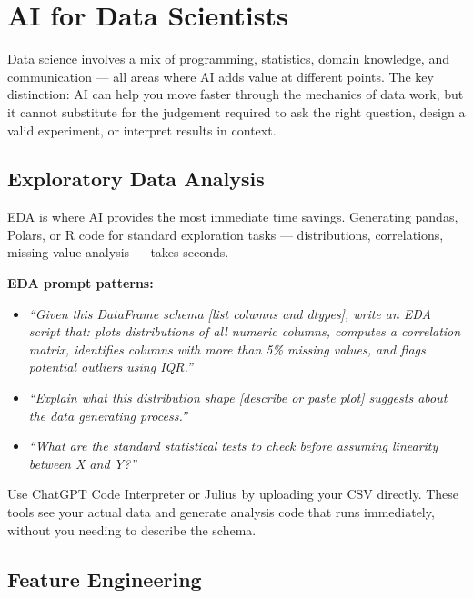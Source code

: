 \chapter{AI for Data Scientists}
\label{ch:datascience}

Data science involves a mix of programming, statistics, domain knowledge, and
communication --- all areas where AI adds value at different points.
The key distinction: AI can help you move faster through the mechanics of data work,
but it cannot substitute for the judgement required to ask the right question,
design a valid experiment, or interpret results in context.

\section{Exploratory Data Analysis}
\label{sec:eda}

EDA is where AI provides the most immediate time savings.
Generating pandas, Polars, or R code for standard exploration tasks --- distributions,
correlations, missing value analysis --- takes seconds.

\textbf{EDA prompt patterns:}
\begin{itemize}
  \item \textit{``Given this DataFrame schema [list columns and dtypes], write an EDA script that: plots distributions of all numeric columns, computes a correlation matrix, identifies columns with more than 5\% missing values, and flags potential outliers using IQR.''}
  \item \textit{``Explain what this distribution shape [describe or paste plot] suggests about the data generating process.''}
  \item \textit{``What are the standard statistical tests to check before assuming linearity between X and Y?''}
\end{itemize}

\begin{tipbox}
Use ChatGPT Code Interpreter or Julius by uploading your CSV directly.
These tools see your actual data and generate analysis code that runs immediately,
without you needing to describe the schema.
\end{tipbox}

\section{Feature Engineering}
\label{sec:features}

